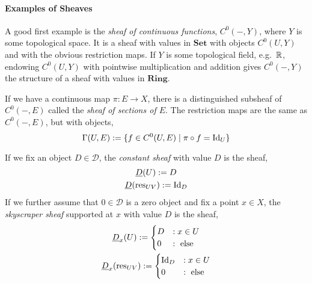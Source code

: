 \documentclass[000-main.tex]{subfiles}
\begin{document}
\paragraph{Examples of Sheaves}

A good first example is the \emph{sheaf of continuous functions}, $C^0(-, Y)$, where $Y$ is some topological space.
It is a sheaf with values in $\mathbf{Set}$ with objects $C^0(U, Y)$ and with the obvious restriction maps.
If $Y$ is some topological field, e.g.\ $\mathbb{R}$, endowing $C^0(U, Y)$ with pointwise multiplication and addition gives $C^0(-, Y)$ the structure of a sheaf with values in $\mathbf{Ring}$.

If we have a continuous map $\pi: E\to X$, there is a distinguished subsheaf of $C^0(-, E)$ called the \emph{sheaf of sections of $E$}.
The restriction maps are the same as $C^0(-, E)$, but with objects,
\begin{displaymath}
  \Gamma(U, E) := \{f\in C^0(U, E)\mid \pi\circ f = \operatorname{Id}_U\}
\end{displaymath}

If we fix an object $D\in \mathcal{D}$, the \emph{constant sheaf} with value $D$ is the sheaf,
\begin{displaymath}
  \begin{gathered}
    \underline{D}(U) := D\\
    \underline{D}\qty(\operatorname{res}_{UV}) := \operatorname{Id}_D
  \end{gathered}
\end{displaymath}
If we further assume that $0\in\mathcal{D}$ is a zero object and fix a point $x\in X$, the \emph{skyscraper sheaf} supported at $x$ with value $D$ is the sheaf,
\begin{displaymath}
  \begin{gathered}
  \underline{D}_x(U) :=
  \begin{cases}
    D &: x\in U\\
    0 &: \text{ else }
  \end{cases}\\
  \underline{D}_x(\operatorname{res}_{UV}) :=
  \begin{cases}
    \operatorname{Id}_D &: x\in U\\
    0 &: \text{ else }
  \end{cases}
\end{gathered}
\end{displaymath}
\end{document}
